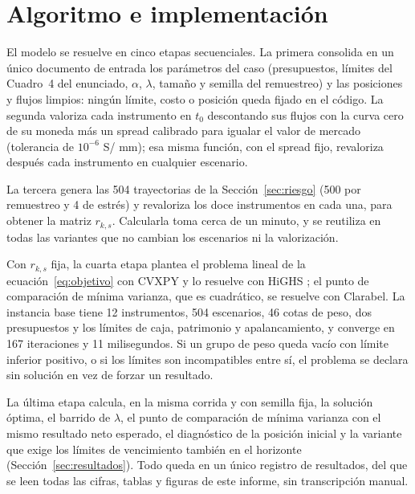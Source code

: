 \section{Algoritmo e implementación}\label{sec:algoritmo}

El modelo se resuelve en cinco etapas secuenciales. La primera consolida en un único documento de entrada
los parámetros del caso (presupuestos, límites del Cuadro~4 del enunciado, $\alpha$, $\lambda$, tamaño y
semilla del remuestreo) y las posiciones y flujos limpios: ningún límite, costo o posición queda fijado en
el código. La segunda valoriza cada instrumento en $t_0$ descontando sus flujos con la curva cero de su
moneda más un spread calibrado para igualar el valor de mercado (tolerancia de $10^{-6}$ S/ mm); esa misma
función, con el spread fijo, revaloriza después cada instrumento en cualquier escenario.

La tercera genera las 504 trayectorias de la Sección~\ref{sec:riesgo} (500 por remuestreo y 4 de estrés) y
revaloriza los doce instrumentos en cada una, para obtener la matriz $r_{k,s}$. Calcularla toma cerca de un
minuto, y se reutiliza en todas las variantes que no cambian los escenarios ni la valorización.

Con $r_{k,s}$ fija, la cuarta etapa plantea el problema lineal de la ecuación~\eqref{eq:objetivo} con
CVXPY \parencite{diamond2016} y lo resuelve con HiGHS \parencite{huangfu2018}; el punto de comparación de
mínima varianza, que es cuadrático, se resuelve con Clarabel. La instancia base tiene 12 instrumentos, 504
escenarios, 46 cotas de peso, dos presupuestos y los límites de caja, patrimonio y apalancamiento, y
converge en 167 iteraciones y 11 milisegundos. Si un grupo de peso queda vacío con límite inferior positivo,
o si los límites son incompatibles entre sí, el problema se declara sin solución en vez de forzar un
resultado.

La última etapa calcula, en la misma corrida y con semilla fija, la solución óptima, el barrido de
$\lambda$, el punto de comparación de mínima varianza con el mismo resultado neto esperado, el diagnóstico
de la posición inicial y la variante que exige los límites de vencimiento también en el horizonte
(Sección~\ref{sec:resultados}). Todo queda en un único registro de resultados, del que se leen todas las
cifras, tablas y figuras de este informe, sin transcripción manual.
